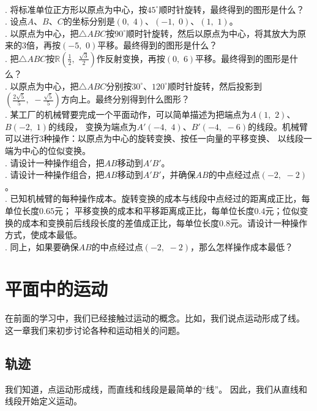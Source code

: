 \documentclass[12pt,UTF8]{ctexbook}
\begin{document}
\begin{xt}
    \mbox{}\\
    . 将标准单位正方形以原点为中心，按$45^\circ$顺时针旋转，最终得到的图形是什么？\\
    . 设点$A$、$B$、$C$的坐标分别是$(0,\,\, 4)$、$(-1,\,\, 0)$、$(1,\,\,1)$。\\
    . 以原点为中心，把$\triangle ABC$按$90^\circ$顺时针旋转，然后以原点为中心，将其放大为原来的$3$倍，再按$(-5, \,\, 0)$平移。最终得到的图形是什么？\\
    . 把$\triangle ABC$按$\mathbb{R}\left(\frac{1}{2},\,\, \frac{\sqrt{3}}{2}\right)$作反射变换，再按$(0,\,\, 6)$平移。最终得到的图形是什么？\\
    . 以原点为中心，把$\triangle ABC$分别按$30^\circ$、$120^\circ$顺时针旋转，然后投影到$\left(\frac{2\sqrt{5}}{5},\,\, -\frac{\sqrt{5}}{5}\right)$方向上。最终分别得到什么图形？\\
    . 某工厂的机械臂要完成一个平面动作，可以简单描述为把端点为$A(1,\,\, 2)$、$B(-2,\,\, 1)$的线段，
    变换为端点为$A'(-4,\,\, 4)$、$B'(-4,\,\, -6)$的线段。机械臂可以进行$3$种操作：以原点为中心的旋转变换、按任一向量的平移变换、
    以线段一端为中心的位似变换。\\
    . 请设计一种操作组合，把$AB$移动到$A'B'$。\\
    . 请设计一种操作组合，把$AB$移动到$A'B'$，并确保$AB$的中点经过点$(-2,\,\, -2)$。\\
    . 已知机械臂的每种操作成本。旋转变换的成本与线段中点经过的距离成正比，每单位长度$0.65$元；
    平移变换的成本和平移距离成正比，每单位长度$0.4$元；位似变换的成本和变换前后线段长度的差值成正比，每单位长度$0.8$元。请设计一种操作方式，使成本最低。\\
    . 同上，如果要确保$AB$的中点经过点$(-2,\,\, -2)$，那么怎样操作成本最低？
\end{xt}

\chapter{平面中的运动}
在前面的学习中，我们已经接触过运动的概念。比如，我们说点运动形成了线。
这一章我们来初步讨论各种和运动相关的问题。

\section{轨迹}
我们知道，点运动形成线，而直线和线段是最简单的“线”。
因此，我们从直线和线段开始定义运动。
\end{document}

